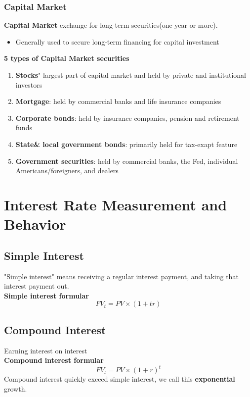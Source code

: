 \documentclass{article}
\theoremstyle{definition}
\theoremstyle{thrm}
\theoremstyle{lma}
\theoremstyle{ppst}
\theoremstyle{crlr}
\begin{document}
\subsubsection{Capital Market}
\textbf{Capital Market} exchange for long-term securities(one year or more). 
\begin{itemize}
	\item Generally used to secure long-term financing for capital investment
\end{itemize}
\textbf{ 5 types of Capital Market securities}
\begin{enumerate}
	\item \textbf{Stocks}" largest part of capital market and held by private and institutional investors
	\item \textbf{Mortgage}: held by commercial banks and life insurance companies
	\item \textbf{Corporate bonds}: held by insurance companies, pension and retirement funds
	\item \textbf{State\& local government bonds}: primarily held for tax-exapt feature
	\item \textbf{Government securities}: held by commercial banks, the Fed, individual Americans/foreigners, and dealers
\end{enumerate}

\section{Interest Rate Measurement and Behavior}
\subsection{Simple Interest}
"Simple interest" means receiving a regular interest payment, and taking that interest payment out.\\
\textbf{Simple interest formular}
\begin{equation*}
	FV_t = PV \times (1+tr)
\end{equation*}
\subsection{Compound Interest}
Earning interest on interest\\
\textbf{Compound interest formular}
\begin{equation*}
	FV_t = PV \times (1+r)^t
\end{equation*}
Compound interest quickly exceed simple interest, we call this \textbf{exponential} growth. \\
\end{document}
